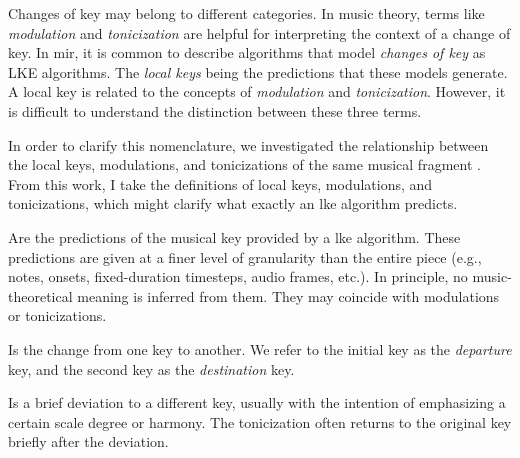 

Changes of key may belong to different categories. In music
theory, terms like \emph{modulation} and \emph{tonicization}
are helpful for interpreting the context of a change of key.
In \gls{mir}, it is common to describe algorithms that model
\emph{changes of key} as \gls{LKE} algorithms. The
\emph{local keys} being the predictions that these models
generate. A local key is related to the concepts of
\emph{modulation} and \emph{tonicization}. However, it is
difficult to understand the distinction between these three
terms.

In order to clarify this nomenclature, we investigated the
relationship between the local keys, modulations, and
tonicizations of the same musical fragment
\parencite{napoleslopez2020local}. From this work, I take
the definitions of local keys, modulations, and
tonicizations, which might clarify what exactly an \gls{lke}
algorithm predicts.

Are the predictions of the musical key provided by a
\gls{lke} algorithm. These predictions are given at a finer
level of granularity than the entire piece (e.g., notes,
onsets, fixed-duration timesteps, audio frames, etc.). In
principle, no music-theoretical meaning is inferred from
them. They may coincide with modulations or tonicizations.

Is the change from one key to another. We refer to the
initial key as the \emph{departure} key, and the second key
as the \emph{destination} key.

Is a brief deviation to a different key, usually with the
intention of emphasizing a certain scale degree or harmony.
The tonicization often returns to the original key briefly
after the deviation.

